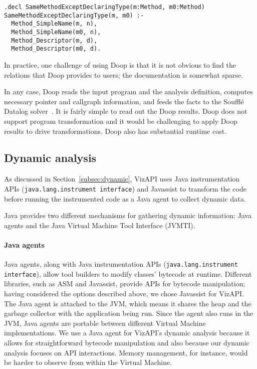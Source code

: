 \begin{lstlisting}
.decl SameMethodExceptDeclaringType(m:Method, m0:Method)
SameMethodExceptDeclaringType(m, m0) :-
  Method_SimpleName(m, n),
  Method_SimpleName(m0, n),
  Method_Descriptor(m, d),
  Method_Descriptor(m0, d).
\end{lstlisting}

In practice, one challenge of using Doop is that it is not obvious to find
the relations that Doop provides to users; the documentation is
somewhat sparse.

In any case, Doop reads the input program and the analysis definition,
computes necessary pointer and callgraph information, and feeds the
facts to the Soufflé Datalog solver~\cite{DBLP:conf/cav/JordanSS16}. It is fairly simple to read out the
Doop results. Doop does not support program transformation and it would
be challenging to apply Doop results to drive transformations. Doop also
has substantial runtime cost.

\subsection{Dynamic analysis}
As discussed in Section~\ref{subsec:dynamic}, VizAPI uses Java instrumentation APIs (\texttt{java.lang.instrument interface}) and Javassist
to transform the code before running the instrumented code as a Java agent to collect
dynamic data.

Java provides two different mechanisms for gathering dynamic information: Java agents and the Java Virtual Machine Tool Interface (JVMTI).

\paragraph{Java agents}
Java agents, along with Java instrumentation APIs (\texttt{java.lang.instrument interface}), allow tool builders to modify classes' bytecode at runtime.
Different libraries, such as ASM and Javassist, provide APIs for bytecode manipulation; having considered the options described above, we chose Javassist for VizAPI.  
The Java agent is attached to the JVM, which means it shares the heap and the garbage collector with the application being run.
Since the agent also runs in the JVM, Java agents are portable between different Virtual Machine implementations.
We use a Java agent for VizAPI's dynamic analysis because it allows for straightforward bytecode manipulation 
and also because our dynamic analysis focuses on API interactions. Memory management, for instance, would be harder to observe from within the Virtual Machine.

